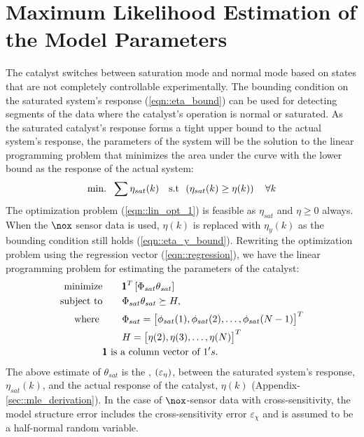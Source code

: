 \section{Maximum Likelihood Estimation of the Model Parameters}

The catalyst switches between saturation mode and normal mode based on states that are not completely controllable
experimentally. The bounding condition on the saturated system's response (\ref{eqn::eta_bound}) can be used for
detecting segments of the data where the catalyst's operation is normal or saturated. As the saturated catalyst's
response forms a tight upper bound to the actual system's response, the parameters of the system will be the solution
to the linear programming problem that minimizes the area under the curve with the lower bound as the response of the
actual system:
\begin{align}
\text{min. } \, \sum \eta_{sat}(k) \quad
\text{s.t } \, \left( \eta_{sat}(k) \geq \eta(k) \right) \quad \forall  k \label{eqn::lin_opt_1}
\end{align}
The optimization problem (\ref{eqn::lin_opt_1}) is feasible as $\eta_{sat}$ and $\eta \geq 0$ always. When the $\nox$ sensor
data is used, $\eta(k)$ is replaced with $\eta_y(k)$ as the bounding condition still holds (\ref{eqn::eta_y_bound}).
Rewriting the optimization problem using the regression vector (\ref{eqn::regression}), we have the linear programming
problem for estimating the parameters of the catalyst:
\begin{align}
        \text{minimize} &\qquad \pmb 1^T \left[ \Phi_{sat} \theta_{sat} \right]      \label{eqn::lin_prog}\\
        \text{subject to} &\qquad \Phi_{sat} \theta_{sat} \succeq H,  \notag\\
        \text{where } & \qquad
        \Phi_{sat} = \begin{bmatrix} \phi_{sat}(1), \phi_{sat}(2), \hdots, \phi_{sat}(N-1) \end{bmatrix}^T \notag\\
        &\qquad H = \begin{bmatrix}  \eta(2), \eta(3), \hdots, \eta(N) \end{bmatrix}^T \notag\\
        & \text{$\pmb 1$ is a column vector of $1's$.} \notag
\end{align}
The above estimate of $\theta_{sat}$ is the , $\left( \varepsilon_\eta \right)$, between the saturated system's response,
$\eta_{sat}(k)$, and the actual response of the catalyst, $\eta(k)$ (Appendix-\ref{sec::mle_derivation}). In the
case of $\nox$-sensor data with cross-sensitivity, the model structure error includes the cross-sensitivity error
$\varepsilon_{\chi}$ and is assumed to be a half-normal random variable.





